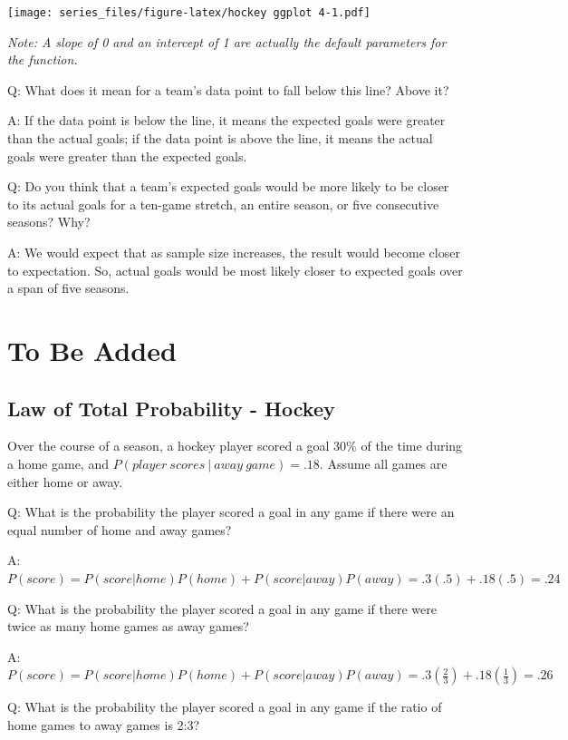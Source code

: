 \documentclass[
]{book}
\theoremstyle{definition}
\theoremstyle{definition}
\theoremstyle{definition}
\theoremstyle{definition}
\theoremstyle{remark}
\begin{document}
\texttt{[image: series\_files/figure-latex/hockey ggplot 4-1.pdf]}

\emph{Note: A slope of 0 and an intercept of 1 are actually the default parameters for the function.}

Q: What does it mean for a team's data point to fall below this line? Above it?

A: If the data point is below the line, it means the expected goals were greater than the actual goals; if the data point is above the line, it means the actual goals were greater than the expected goals.

Q: Do you think that a team's expected goals would be more likely to be closer to its actual goals for a ten-game stretch, an entire season, or five consecutive seasons? Why?

A: We would expect that as sample size increases, the result would become closer to expectation. So, actual goals would be most likely closer to expected goals over a span of five seasons.

\hypertarget{to-be-added-1}{%
\section{To Be Added}\label{to-be-added-1}}

\hypertarget{law-of-total-probability---hockey}{%
\subsection{Law of Total Probability - Hockey}\label{law-of-total-probability---hockey}}

Over the course of a season, a hockey player scored a goal 30\% of the time during a home game, and \(P(player\ scores\ |\ away\ game) = .18\). Assume all games are either home or away.

Q: What is the probability the player scored a goal in any game if there were an equal number of home and away games?

A: \(P(score) = P(score|home)P(home) + P(score|away)P(away) = .3(.5) + .18(.5) = .24\)

Q: What is the probability the player scored a goal in any game if there were twice as many home games as away games?

A: \(P(score) = P(score|home)P(home) + P(score|away)P(away) = .3(\frac{2}{3}) + .18(\frac{1}{3}) = .26\)

Q: What is the probability the player scored a goal in any game if the ratio of home games to away games is 2:3?
\end{document}

